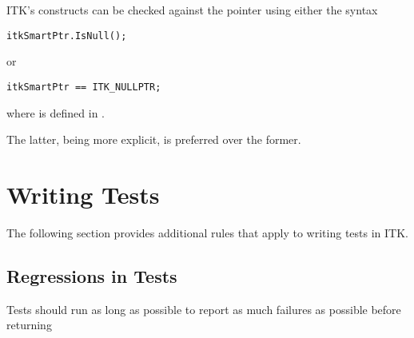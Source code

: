 ITK's  constructs can be checked against the 
pointer using either the syntax

\small
\begin{verbatim}
itkSmartPtr.IsNull();
\end{verbatim}
\normalsize

or

\small
\begin{verbatim}
itkSmartPtr == ITK_NULLPTR;
\end{verbatim}
\normalsize

where  is defined in .

The latter, being more explicit, is preferred over the former.


\section{Writing Tests}
\label{sec:WritingTests}

The following section provides additional rules that apply to writing tests
in ITK.


\subsection{Regressions in Tests}
\label{subsec:RegressionsInTests}

Tests should run as long as possible to report as much failures as possible before returning

